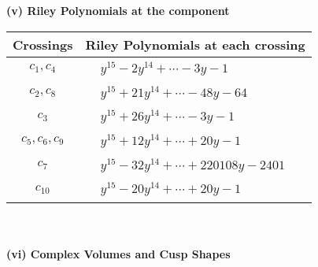 \documentclass[1p]{elsarticle_modified}
\theoremstyle{definition}
\begin{document}
\newpage\renewcommand{\arraystretch}{1}
\flushleft \textbf{(v) Riley Polynomials at the component}\newline \\
\begin{tabular}{m{50pt}|m{274pt}}
Crossings & \hspace{64pt}Riley Polynomials at each crossing \\
\hline $$\begin{aligned}c_{1},c_{4}\end{aligned}$$&$\begin{aligned}
&y^{15}-2 y^{14}+\cdots-3 y-1
\end{aligned}$\\
\hline $$\begin{aligned}c_{2},c_{8}\end{aligned}$$&$\begin{aligned}
&y^{15}+21 y^{14}+\cdots-48 y-64
\end{aligned}$\\
\hline $$\begin{aligned}c_{3}\end{aligned}$$&$\begin{aligned}
&y^{15}+26 y^{14}+\cdots-3 y-1
\end{aligned}$\\
\hline $$\begin{aligned}c_{5},c_{6},c_{9}\end{aligned}$$&$\begin{aligned}
&y^{15}+12 y^{14}+\cdots+20 y-1
\end{aligned}$\\
\hline $$\begin{aligned}c_{7}\end{aligned}$$&$\begin{aligned}
&y^{15}-32 y^{14}+\cdots+220108 y-2401
\end{aligned}$\\
\hline $$\begin{aligned}c_{10}\end{aligned}$$&$\begin{aligned}
&y^{15}-20 y^{14}+\cdots+20 y-1
\end{aligned}$\\
\hline
\end{tabular}\\~\\
\newpage\flushleft \textbf{(vi) Complex Volumes and Cusp Shapes}
\end{document}
